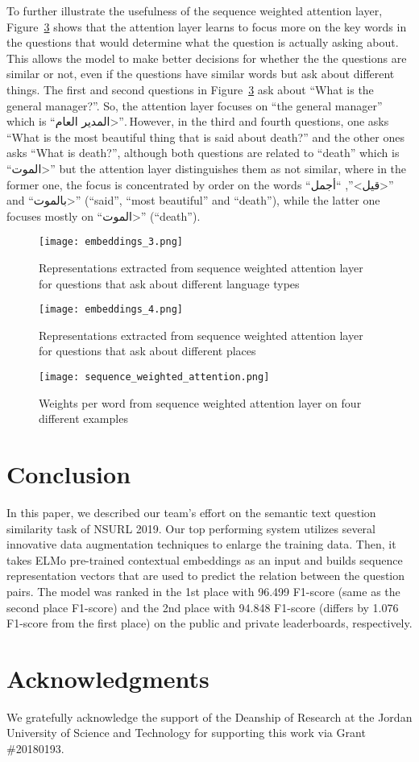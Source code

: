 \documentclass[11pt,a4paper]{article}
\begin{document}
To further illustrate the usefulness of the sequence weighted attention layer, Figure~\ref{sequence_weighted_attention} shows that the attention layer learns to focus more on the key words in the questions that would determine what the question is actually asking about. This allows the model to make better decisions for whether the the questions are similar or not, even if the questions have similar words but ask about different things. The first and second questions in Figure~\ref{sequence_weighted_attention} ask about ``What is the general manager?''. So, the attention layer focuses on ``the general manager'' which is ``\<المدير العام>''. However, in the third and fourth questions, one asks ``What is the most beautiful thing that is said about death?'' and the other ones asks ``What is death?'', although both questions are related to ``death'' which is ``\<الموت>'' but the attention layer distinguishes them as not similar, where in the former one, the focus is concentrated by order on the words
``\<قيل>'',
``\<أجمل>''
and
``\<بالموت>''
(``said'', ``most beautiful'' and ``death''), while the latter one focuses mostly on
``\<الموت>''
(``death'').

\begin{figure}
    \centering
    \texttt{[image: embeddings\_3.png]}
    \caption{Representations extracted from sequence weighted attention layer for questions that ask about different language types}
    \label{embeddings_3}
\end{figure}

\begin{figure}
    \centering
    \texttt{[image: embeddings\_4.png]}
    \caption{Representations extracted from sequence weighted attention layer for questions that ask about different places}
    \label{embeddings_4}
\end{figure}

\begin{figure}
    \centering
    \texttt{[image: sequence\_weighted\_attention.png]}
    \caption{Weights per word from sequence weighted attention layer on four different examples}
    \label{sequence_weighted_attention}
\end{figure}

\section{Conclusion}
\label{sec:conc}
In this paper, we described our team's effort on the semantic text question similarity task of NSURL 2019. Our top performing system utilizes several innovative data augmentation techniques to enlarge the training data. Then, it takes ELMo pre-trained contextual embeddings as an input and builds sequence representation vectors that are used to predict the relation between the question pairs. The model was ranked in the 1st place with 96.499 F1-score (same as the second place F1-score) and the 2nd place with 94.848 F1-score (differs by 1.076 F1-score from the first place) on the public and private leaderboards, respectively.


\section*{Acknowledgments}
We gratefully acknowledge the support of the Deanship of Research at the Jordan University of Science and Technology for supporting this work via Grant \#20180193.



\end{document}
